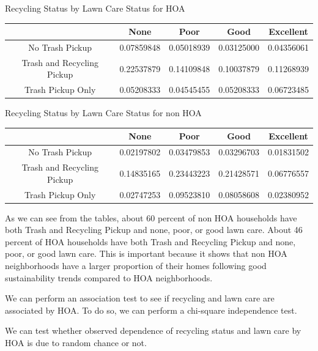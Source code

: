 \documentclass{article}
\begin{document}
\begin{center} Recycling Status by Lawn Care Status for HOA \end{center}
\begin{table}[H]
\begin{tabular}{|c|c|c|c|c|} \hline
                           & None       & Poor       & Good       & Excellent  \\ \hline
No Trash Pickup            & 0.07859848 & 0.05018939 & 0.03125000 & 0.04356061 \\ \hline
Trash and Recycling Pickup & 0.22537879 & 0.14109848 & 0.10037879 & 0.11268939 \\ \hline
Trash Pickup Only          & 0.05208333 & 0.04545455 & 0.05208333 & 0.06723485 \\ \hline
\end{tabular}
\end{table}

\begin{center} Recycling Status by Lawn Care Status for non HOA \end{center}
\begin{table}[H]
\begin{tabular}{|c|c|c|c|c|} \hline
                           & None       & Poor       & Good       & Excellent  \\ \hline
No Trash Pickup            & 0.02197802 & 0.03479853 & 0.03296703 & 0.01831502 \\ \hline
Trash and Recycling Pickup & 0.14835165 & 0.23443223 & 0.21428571 & 0.06776557 \\ \hline
Trash Pickup Only          & 0.02747253 & 0.09523810 & 0.08058608 & 0.02380952 \\ \hline
\end{tabular}
\end{table}

As we can see from the tables, about 60 percent of non HOA households have both Trash and Recycling Pickup and none, poor, or good lawn care. About 46 percent of HOA households have both Trash and Recycling Pickup and none, poor, or good lawn care. This is important because it shows that non HOA neighborhoods have a larger proportion of their homes following good sustainability trends compared to HOA neighborhoods. 

We can perform an association test to see if recycling and lawn care are associated by HOA. To do so, we can perform a chi-square independence test.

We can test whether observed dependence of recycling status and lawn care by HOA is due to random chance or not. 
\end{document}
